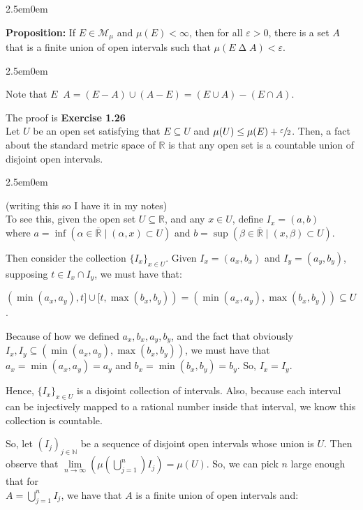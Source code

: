 \documentclass{book}
\newcommand{\hTwo}{%
\color{MidnightBlue}%
   \fontsize{13}{15}\selectfont%
}
\newcommand{\hThree}{%
   \color{PineGreen!85!Orange}
   \fontsize{12}{14}\selectfont%
}
\newcommand{\exP}{%
   \color{Purple}%
   \fontsize{12}{14}\selectfont%
}
\newcommand{\exPP}{%
   \color{RedViolet}%
   \fontsize{12}{14}\selectfont%
}
\newcommand{\exPPP}{%
   \color{VioletRed}%
   \fontsize{12}{14}\selectfont%
}
\newenvironment{myIndent}{%
   \begin{adjustwidth}{2.5em}{0em}%
}{%
   \end{adjustwidth}%
}
\newcommand{\blab}[1]{\textbf{#1}}
\newcommand{\retTwo}{\hfill\bigbreak}
\begin{document}
\begin{myIndent}\hTwo
   \blab{Proposition:} If $E \in \mathcal{M}_\mu$ and $\mu(E) < \infty$, then for all $\varepsilon > 0$, there is a set $A$ that is a finite union of open intervals such that $\mu(E \mathop{\Delta} A) < \varepsilon$.
   
   \begin{myIndent}\hThree
      Note that $E \mathop(\Delta) A = (E - A) \cup (A - E) = (E \cup A) - (E \cap A)$.\retTwo
      
      \exP The proof is \blab{Exercise 1.26}\\
      \exPP Let $U$ be an open set satisfying that $E \subseteq U$ and $\mu(U) \leq \mu(E) + \sfrac{\varepsilon}{2}$. Then, a fact about the standard metric space of $\mathbb{R}$ is that any open set is a countable union of disjoint open intervals.

      
      \begin{myIndent}\exPPP
         (writing this so I have it in my notes)\\
         To see this, given the open set $U \subseteq \mathbb{R}$, and any $x \in U$, define $I_x = (a, b)$\\ where $a = \inf({\alpha \in \overline{\mathbb{R}}} \mid (\alpha, x) \subset U)$ and $b = \sup({\beta \in \overline{\mathbb{R}}} \mid (x, \beta) \subset U)$.\retTwo

         Then consider the collection $\{I_x\}_{x \in U}$. Given $I_x = (a_x, b_x)$ and $I_y = (a_y, b_y)$, supposing $t \in I_x \cap I_y$, we must have that:
         
         {\centering $(\min(a_x, a_y), t] \cup [t, \max(b_x, b_y)) = (\min(a_x, a_y), \max(b_x, b_y)) \subseteq U$. \retTwo\par}

         Because of how we defined $a_x, b_x, a_y, b_y$, and the fact that obviously\\ $I_x, I_y \subseteq (\min(a_x, a_y), \max(b_x, b_y))$, we must have that $a_x = \min(a_x, a_y) = a_y$ and $b_x = \min(b_x, b_y) = b_y$. So, $I_x = I_y$.\retTwo

         Hence, $\{I_x\}_{x \in U}$ is a disjoint collection of intervals. Also, because each interval can be injectively mapped to a rational number inside that interval, we know this collection is countable.\retTwo
      \end{myIndent}

      So, let $(I_j)_{j \in \mathbb{N}}$ be a sequence of disjoint open intervals whose union is $U$. Then observe that $\lim\limits_{n \rightarrow \infty}(\mu(\bigcup\limits_{j=1}^n)I_j) = \mu(U)$. So, we can pick $n$ large enough that for\\ [-9pt] $A = \bigcup\limits_{j=1}^n I_j$, we have that $A$ is a finite union of open intervals and:


\end{myIndent}
\end{myIndent}
\end{document}

